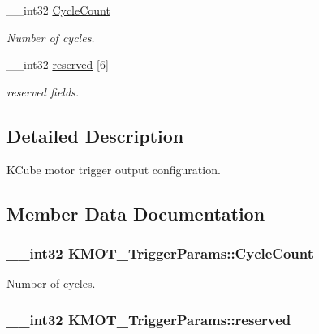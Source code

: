 \begin{DoxyCompactItemize}
\+\_\+\+\_\+int32 \hyperlink{struct_k_m_o_t___trigger_params_acb3c38b7d002274ee391d6ee7cd78056}{Cycle\+Count}
\begin{DoxyCompactList}\small\item\em Number of cycles. \end{DoxyCompactList}\item 
\+\_\+\+\_\+int32 \hyperlink{struct_k_m_o_t___trigger_params_a143e2d31a605d31f3cf874fbc1be11ba}{reserved} \mbox{[}6\mbox{]}
\begin{DoxyCompactList}\small\item\em reserved fields. \end{DoxyCompactList}\end{DoxyCompactItemize}


\subsection{Detailed Description}
K\+Cube motor trigger output configuration. 



\subsection{Member Data Documentation}
\subsubsection[{\texorpdfstring{Cycle\+Count}{CycleCount}}]{\setlength{\rightskip}{0pt plus 5cm}\+\_\+\+\_\+int32 K\+M\+O\+T\+\_\+\+Trigger\+Params\+::\+Cycle\+Count}\hypertarget{struct_k_m_o_t___trigger_params_acb3c38b7d002274ee391d6ee7cd78056}{}\label{struct_k_m_o_t___trigger_params_acb3c38b7d002274ee391d6ee7cd78056}


Number of cycles. 

\subsubsection[{\texorpdfstring{reserved}{reserved}}]{\setlength{\rightskip}{0pt plus 5cm}\+\_\+\+\_\+int32 K\+M\+O\+T\+\_\+\+Trigger\+Params\+::reserved}\hypertarget{struct_k_m_o_t___trigger_params_a143e2d31a605d31f3cf874fbc1be11ba}{}\label{struct_k_m_o_t___trigger_params_a143e2d31a605d31f3cf874fbc1be11ba}


